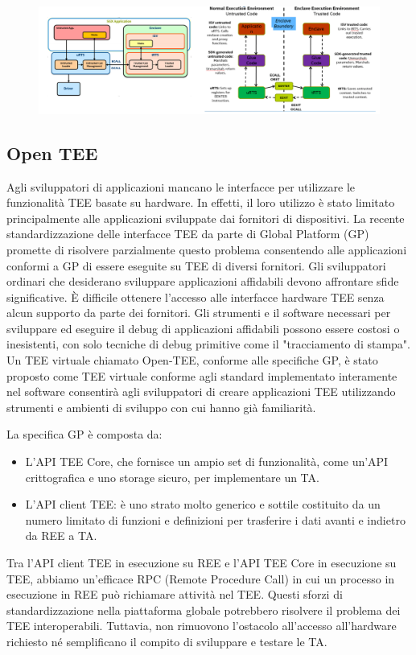 \begin{figure}[htb!]
    \centering
    \includegraphics[width=13cm]{./Images/cap6/6.8.png}
\end{figure}

\subsection{Open TEE}
Agli sviluppatori di applicazioni mancano le interfacce per utilizzare le
funzionalità TEE basate su hardware. In effetti, il loro utilizzo è stato limitato
principalmente alle applicazioni sviluppate dai fornitori di dispositivi. La
recente standardizzazione delle interfacce TEE da parte di Global Platform
(GP) promette di risolvere parzialmente questo problema consentendo alle
applicazioni conformi a GP di essere eseguite su TEE di diversi fornitori.
Gli sviluppatori ordinari che desiderano sviluppare applicazioni affidabili
devono affrontare sfide significative. È difficile ottenere l'accesso alle
interfacce hardware TEE senza alcun supporto da parte dei fornitori. Gli
strumenti e il software necessari per sviluppare ed eseguire il debug di
applicazioni affidabili possono essere costosi o inesistenti, con solo tecniche
di debug primitive come il "tracciamento di stampa".
Un TEE virtuale chiamato Open-TEE, conforme alle specifiche GP, è stato
proposto come TEE virtuale conforme agli standard implementato
interamente nel software consentirà agli sviluppatori di creare applicazioni
TEE utilizzando strumenti e ambienti di sviluppo con cui hanno già familiarità.

La specifica GP è composta da:
\begin{itemize}
    \item L'API TEE Core, che fornisce un ampio set
di funzionalità, come un'API crittografica e uno storage sicuro, per
implementare un TA.
    \item L'API client TEE: è uno strato molto
generico e sottile costituito da un
numero limitato di funzioni e
definizioni per trasferire i dati avanti
e indietro da REE a TA.
\end{itemize}
Tra l'API client TEE in esecuzione su REE e l'API TEE Core in esecuzione su TEE,
abbiamo un'efficace RPC (Remote Procedure Call) in cui un processo in
esecuzione in REE può richiamare attività nel TEE.
Questi sforzi di standardizzazione nella piattaforma globale potrebbero
risolvere il problema dei TEE interoperabili. Tuttavia, non rimuovono
l'ostacolo all'accesso all'hardware richiesto né semplificano il compito di
sviluppare e testare le TA.

